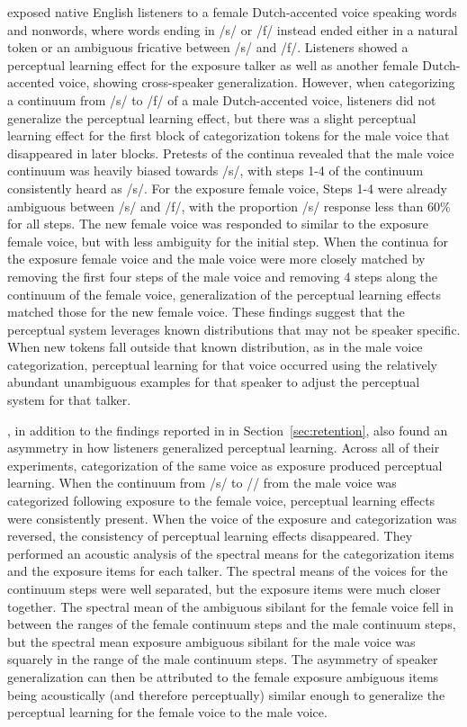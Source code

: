 \citet{Reinisch2013a} exposed native English listeners to a female Dutch-accented voice speaking words and nonwords, where words ending in /s/ or /f/ instead ended either in a natural token or an ambiguous fricative between /s/ and /f/.  
Listeners showed a perceptual learning effect for the exposure talker as well as another female Dutch-accented voice, showing cross-speaker generalization.  
However, when categorizing a continuum from /s/ to /f/ of a male Dutch-accented voice, listeners did not generalize the perceptual learning effect, but there was a slight perceptual learning effect for the first block of categorization tokens for the male voice that disappeared in later blocks.  
Pretests of the continua revealed that the male voice continuum was heavily biased towards /s/, with steps 1-4 of the continuum consistently heard as /s/. 
 For the exposure female voice, Steps 1-4 were already ambiguous between /s/ and /f/, with the proportion /s/ response less than 60\% for all steps.  
The new female voice was responded to similar to the exposure female voice, but with less ambiguity for the initial step.  
When the continua for the exposure female voice and the male voice were more closely matched by removing the first four steps of the male voice and removing 4 steps along the continuum of the female voice, generalization of the perceptual learning effects matched those for the new female voice.  
These findings suggest that the perceptual system leverages known distributions that may not be speaker specific.  
When new tokens fall outside that known distribution, as in the male voice categorization, perceptual learning for that voice occurred using the relatively abundant unambiguous examples for that speaker to adjust the perceptual system for that talker.

\citet{Kraljic2005}, in addition to the findings reported in in Section~\ref{sec:retention}, also found an asymmetry in how listeners generalized perceptual learning.  
Across all of their experiments, categorization of the same voice as exposure produced perceptual learning.  
When the continuum from /s/ to /\textesh/ from the male voice was categorized following exposure to the female voice, perceptual learning effects were consistently present.
When the voice of the exposure and categorization was reversed, the consistency of perceptual learning effects disappeared. 
They performed an acoustic analysis of the spectral means for the categorization items and the exposure items for each talker.  
The spectral means of the voices for the continuum steps were well separated, but the exposure items were much closer together.  
The spectral mean of the ambiguous sibilant for the female voice fell in between the ranges of the female continuum steps and the male continuum steps, but the spectral mean exposure ambiguous sibilant for the male voice was squarely in the range of the male continuum steps.  
The asymmetry of speaker generalization can then be attributed to the female exposure ambiguous items being acoustically (and therefore perceptually) similar enough to generalize the perceptual learning for the female voice to the male voice.

